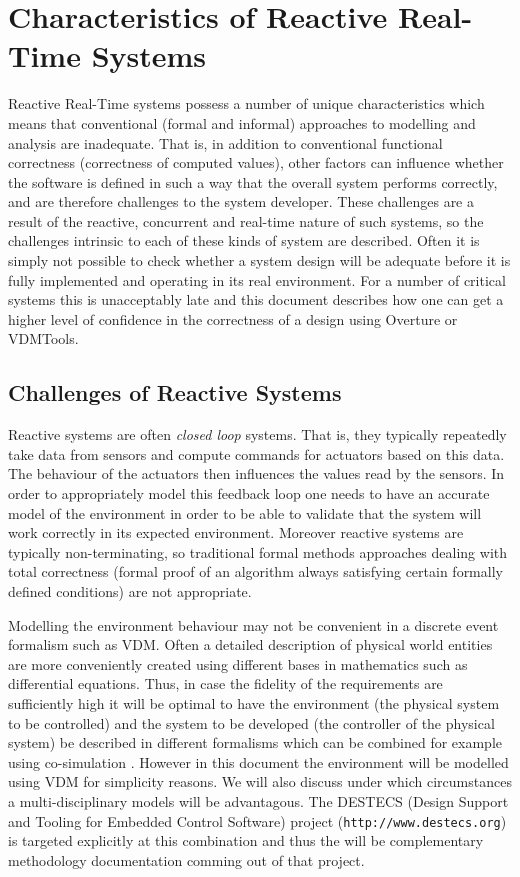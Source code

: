 \documentclass{overturerepchap}
\newcommand{\VDMTools}{VDMTools}
\newcommand{\url}[1]{\texttt{#1}}
\begin{document}
\section{Characteristics of Reactive Real-Time Systems}

Reactive Real-Time systems possess a number of unique characteristics
which means that conventional (formal and informal) approaches to
modelling and analysis are inadequate. That is, in addition to
conventional functional correctness (correctness of computed values),
other factors can influence whether the software is defined in such a
way that the overall system performs correctly, and are therefore
challenges to the system developer. These challenges are a result of
the reactive, concurrent and real-time nature of such systems, so the
challenges intrinsic to each of these kinds of system are
described. Often it is simply not possible to check whether a system
design will be adequate before it is fully implemented and operating
in its real environment. For a number of critical systems this is
unacceptably late and this document describes how one can get a higher
level of confidence in the correctness of a design using Overture or 
\VDMTools.

\subsection{Challenges of Reactive Systems}

Reactive systems are often \emph{closed loop} systems. That is, they
typically repeatedly take data from sensors and compute commands for
actuators based on this data. The behaviour of the actuators then
influences the values read by the sensors. In order to appropriately
model this feedback loop one needs to have an accurate model of the
environment in order to be able to validate that the system will work
correctly in its expected environment. Moreover reactive systems are
typically non-terminating, so traditional formal methods approaches
dealing with total correctness (formal proof of an algorithm always 
satisfying certain formally defined conditions) are not appropriate. 

Modelling the environment behaviour may not be convenient in a
discrete event formalism such as VDM. Often a detailed description of
physical world entities are more conveniently created using different
bases in mathematics such as differential equations. Thus, in case the
fidelity of the requirements are sufficiently high it will be optimal
to have the environment (the physical system to be controlled) and the
system to be developed (the controller of the physical system) be
described in different formalisms which can be combined for example
using co-simulation \cite{Broenink&10}. However in this document the
environment will be modelled using VDM for simplicity reasons. We will
also discuss under which circumstances a multi-disciplinary models
will be advantagous. The DESTECS (Design Support and Tooling for
Embedded Control Software) project (\url{http://www.destecs.org}) is
targeted explicitly at this combination and thus the will be
complementary methodology documentation comming out of that project.
\end{document}
